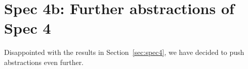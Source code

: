 
\section{Spec 4b: Further abstractions of Spec 4}

Disappointed with the results in Section~\ref{sec:spec4}, we have decided to
push abstractions even further.

